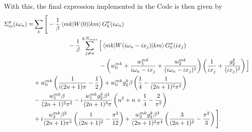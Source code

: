 \documentclass[12pt,a4paper]{scrartcl}
\numberwithin{equation}{section}
\begin{document}
With this, the final expression implemented in the Code is then given by
\begin{align}
  \Sigma_m^{\sigma}(i\omega_n) 
%
  =& \sum_k\Bigg[ -\frac{1}{\beta} 
   \braket{m k | W(0 )|k m}G^{\sigma}_{k}(i\omega_n) \nonumber \\
%
   & \hspace{2cm}-\frac{1}{\beta}\sum_{j\neq n}^{\pm N_{max}} 
   \Big[ \braket{m k | W(i\omega_n- ix_j ) |k m}  G^{\sigma}_{k}(ix_j) \nonumber \\
%
   &\hspace{3.8cm} -\left( w^{mk}_0 + \frac{w^{mk}_1}{i\omega_n -ix_j} + \frac{w^{mk}_2}{(i\omega_n- ix_j)^2}\right)
       \left( \frac{1}{ix_j} + \frac{g^k_2}{(ix_j)^2} \right)  \Big]\nonumber \\
& +w^{mk}_0 \left( \frac{1}{i(2n+1)\pi} -\frac{1}{2} \right) 
  + w^{mk}_0 g^k_2\beta\left( \frac{1}{4} -\frac{1}{(2n+1)^2\pi^2} \right) \nonumber \\
%
& -\frac{ w^{mk}_1 \beta }{(2n+1)^2 \pi^2} 
  -i\frac{w^{mk}_1 g^k_2 \beta^2}{(2n+1)^3 \pi} \left( n^2 + n + \frac{1}{4} - \frac{2}{\pi^2} \right)\nonumber \\
%
& + i\frac{w^{mk}_2\beta^2}{(2n+1)\pi^3}\left( \frac{1}{(2n+1)^2} - \frac{\pi^2}{12} \right) 
  + \frac{w^{mk}_2g^k_2\beta^3}{(2n+1)^2\pi^4}\left( \frac{3}{(2n+1)^2} - \frac{\pi^2}{3} \right) \Bigg] .
 \end{align}
 
 
\end{document}
